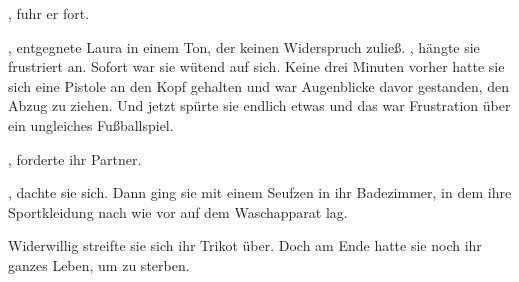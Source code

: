 , fuhr er fort. 

\par

, entgegnete Laura in einem Ton, der keinen Widerspruch zuließ. , hängte sie frustriert an. Sofort war sie wütend auf sich. Keine drei Minuten vorher hatte sie sich eine Pistole an den Kopf gehalten und war Augenblicke davor gestanden, den Abzug zu ziehen. Und jetzt spürte sie endlich etwas und das war Frustration über ein ungleiches Fußballspiel.

\par

, forderte ihr Partner.

\par

, dachte sie sich. Dann ging sie mit einem Seufzen in ihr Badezimmer, in dem ihre Sportkleidung nach wie vor auf dem Waschapparat lag.

\par

Widerwillig streifte sie sich ihr Trikot über. Doch am Ende hatte sie noch ihr ganzes Leben, um zu sterben.

